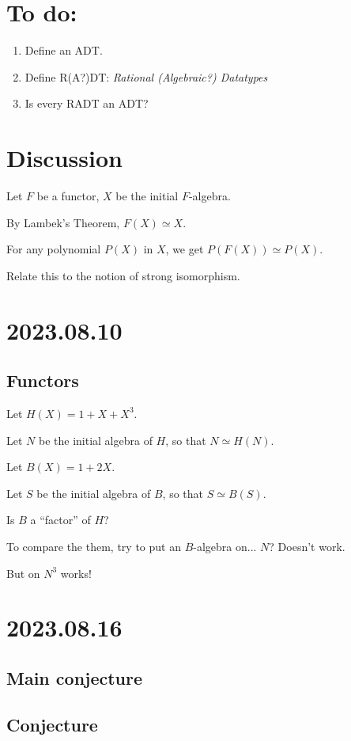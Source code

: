 \documentclass[letterpaper,numbers=enddot]{scrartcl}
\begin{document}
\section{To do:}
\begin{enumerate}
  \item Define an ADT.
  \item Define R(A?)DT: \emph{Rational (Algebraic?) Datatypes}
  \item Is every RADT an ADT?
\end{enumerate}

\section{Discussion}
Let $F$ be a functor, $X$ be the initial $F$-algebra.

By Lambek's Theorem, $F(X) \simeq X$.

For any polynomial $P(X)$ in $X$, we get $P(F(X)) \simeq P(X)$.

Relate this to the notion of strong isomorphism.

\section{2023.08.10}

\subsection*{Functors}
Let $H(X) = 1 + X + X^3$.

Let $N$ be the initial algebra of $H$, so that $N \simeq H(N)$.

Let $B(X) = 1 + 2X$.

Let $S$ be the initial algebra of $B$, so that $S \simeq B(S)$.

Is $B$ a ``factor'' of $H$?

To compare the them, try to put an $B$-algebra on... $N$? Doesn't work.

But on $N^3$ works!

\section{2023.08.16}

\subsection{Main conjecture}


\subsection{Conjecture}
\end{document}

